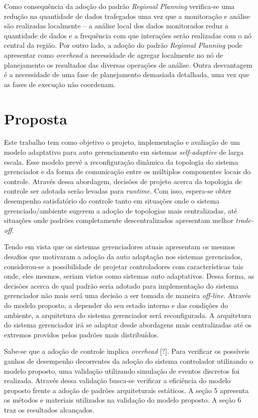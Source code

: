 \documentclass[conference]{IEEEtran}
\begin{document}
Como consequência da adoção do padrão \textit{Regional Planning} verifica-se uma redução na quantidade de dados trafegados uma vez que a monitoração e análise são realizadas localmente -- a análise local dos dados monitorados reduz a quantidade de dados e a frequência com que interações serão realizadas com o nó central da região. Por outro lado, a adoção do padrão \textit{Regional Planning} pode apresentar como \textit{overhead} a necessidade de agregar localmente no nó de planejamento os resultados das diversas operações de análise. Outra desvantagem é a necessidade de uma fase de planejamento demasiada detalhada, uma vez que as fases de execução não coordenam.



\section{Proposta}

Este trabalho tem como objetivo o projeto, implementação e avaliação de um modelo adaptativo para auto gerenciamento em sistemas \textit{self-adaptive} de larga escala. Esse modelo prevê a reconfiguração dinâmica da topologia do sistema gerenciador e da forma de comunicação entre os múltiplos componentes locais do controle. Através dessa abordagem, decisões de projeto acerca da topologia de controle ser adotada serão levadas para \textit{runtime}. Com isso, espera-se obter desempenho satisfatório do controle tanto em situações onde o sistema gerenciado/ambiente sugerem a adoção de topologias mais centralizadas, até situações onde padrões completamente descentralizados apresentam melhor \textit{trade-off}.

Tendo em vista que os sistemas gerenciadores atuais apresentam os mesmos desafios que motivaram a adoção da auto adaptação nos sistemas gerenciados, considerou-se a possibilidade de projetar controladores com características tais onde, eles mesmos, seriam vistos como sistemas auto adaptativos. Dessa forma, as decisões acerca de qual padrão seria adotado para implementação do sistema gerenciador não mais será uma decisão a ser tomada de maneira \textit{off-line}. Através do modelo proposto, a depender do seu estado interno e das condições do ambiente, a arquitetura do sistema gerenciador será reconfigurada. A arquitetura do sistema gerenciador irá se adaptar desde abordagens mais centralizadas até os extremos providos pelos padrões mais distribuídos.

Sabe-se que a adoção de controle implica \textit{overhead} [?]. Para verificar os possíveis ganhos de desempenho decorrentes da adoção do sistema controlador utilizando o modelo proposto, uma validação utilizando simulação de eventos discretos foi realizada. Através dessa validação busca-se verificar a eficiência do modelo proposto frente a adoção de padrões arquiteturais estáticos. A seção 5 apresenta os métodos e materiais utilizados na validação do modelo proposto. A seção 6 traz os resultados alcançados.
\end{document}
